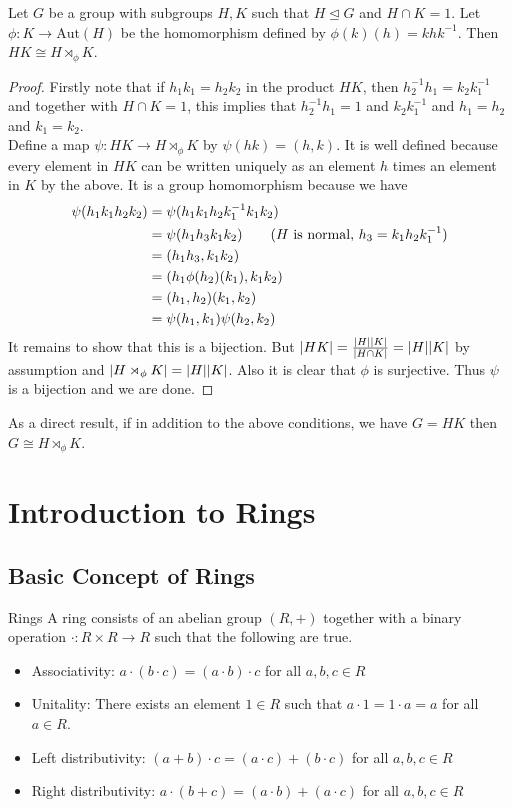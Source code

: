 \documentclass[a4paper]{article}
\begin{document}
\begin{thm}{}{} Let $G$ be a group with subgroups $H,K$ such that $H\trianglelefteq G$ and $H\cap K=1$. Let $\phi:K\to\text{Aut}(H)$ be the homomorphism defined by $\phi(k)(h)=khk^{-1}$. Then $HK\cong H\rtimes_\phi K$. 
\begin{proof}
Firstly note that if $h_1k_1=h_2k_2$ in the product $HK$, then $h_2^{-1}h_1=k_2k_1^{-1}$ and together with $H\cap K=1$, this implies that $h_2^{-1}h_1=1$ and $k_2k_1^{-1}$ and $h_1=h_2$ and $k_1=k_2$. \\

Define a map $\psi:HK\to H\rtimes_\phi K$ by $\psi(hk)=(h,k)$. It is well defined because every element in $HK$ can be written uniquely as an element $h$ times an element in $K$ by the above. It is a group homomorphism because we have 
\begin{align*}
\psi(h_1k_1h_2k_2)&=\psi(h_1k_1h_2k_1^{-1}k_1k_2)\\
&=\psi(h_1h_3k_1k_2)\tag{$H$ is normal, $h_3=k_1h_2k_1^{-1}$}\\
&=(h_1h_3,k_1k_2)\\
&=(h_1\phi(h_2)(k_1),k_1k_2)\\
&=(h_1,h_2)(k_1,k_2)\\
&=\psi(h_1,k_1)\psi(h_2,k_2)
\end{align*}
It remains to show that this is a bijection. But $\abs{HK}=\frac{\abs{H}\abs{K}}{\abs{H\cap K}}=\abs{H}\abs{K}$ by assumption and $\abs{H\rtimes_\phi K}=\abs{H}\abs{K}$. Also it is clear that $\phi$ is surjective. Thus $\psi$ is a bijection and we are done. 
\end{proof}
\end{thm}

As a direct result, if in addition to the above conditions, we have $G=HK$ then $G\cong H\rtimes_\phi K$. 

\pagebreak
\section{Introduction to Rings}
\subsection{Basic Concept of Rings}
\begin{defn}{Rings}{} A ring consists of an abelian group $(R,+)$ together with a binary operation $\cdot:R\times R\to R$ such that the following are true. 
\begin{itemize}
\item Associativity: $a\cdot(b\cdot c)=(a\cdot b)\cdot c$ for all $a,b,c\in R$
\item Unitality: There exists an element $1\in R$ such that $a\cdot 1=1\cdot a=a$ for all $a\in R$. 
\item Left distributivity: $(a+b)\cdot c=(a\cdot c)+(b\cdot c)$ for all $a,b,c\in R$
\item Right distributivity: $a\cdot(b+c)=(a\cdot b)+(a\cdot c)$ for all $a,b,c\in R$
\end{itemize}
\end{defn}
\end{document}
